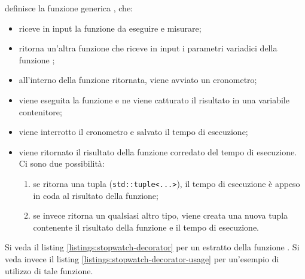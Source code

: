 \noindent {} definisce la funzione generica , che:

\begin{itemize}
    \item riceve in input la funzione  da eseguire e misurare;
    \item ritorna un'altra funzione che riceve in input i parametri variadici  della funzione ;
    \item all'interno della funzione ritornata, viene avviato un cronometro;
    \item viene eseguita la funzione e ne viene catturato il risultato in una variabile contenitore;
    \item viene interrotto il cronometro e salvato il tempo di esecuzione;
    \item viene ritornato il risultato della funzione corredato del tempo di esecuzione. Ci sono due possibilità:
    \begin{enumerate}
        \item se  ritorna una tupla (\texttt{std::tuple<...>}), il tempo di esecuzione è appeso in coda al risultato della funzione;
        \item se invece  ritorna un qualsiasi altro tipo, viene creata una nuova tupla contenente il risultato della funzione e il tempo di esecuzione.
    \end{enumerate}
\end{itemize}

Si veda il listing \ref{listings:stopwatch-decorator} per un estratto della funzione .
Si veda invece il listing \ref{listings:stopwatch-decorator-usage} per un'esempio di utilizzo di tale funzione.

